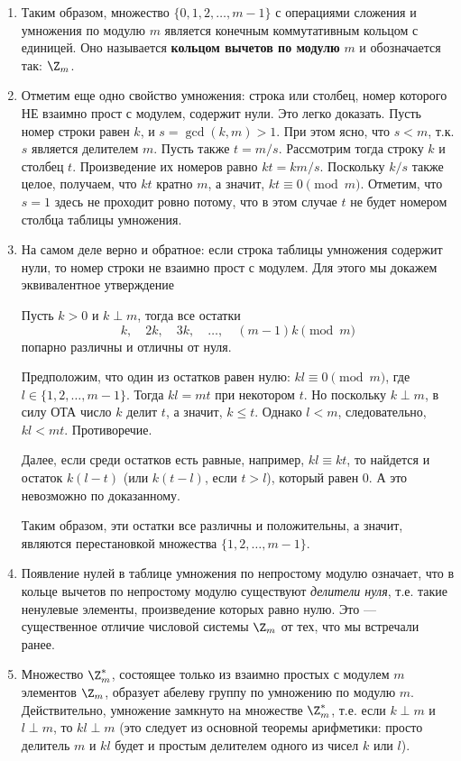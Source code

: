 \begin{enumerate}
\item Таким образом, множество $\{0,1,2,\dots,m-1\}$ с операциями сложения и умножения по модулю $m$ является конечным коммутативным кольцом с единицей. Оно называется \textbf{кольцом вычетов по модулю} $m$ и обозначается так: $\Z_m$.

\item Отметим еще одно свойство умножения: строка или столбец, номер которого НЕ взаимно прост с модулем, содержит нули. Это легко доказать. Пусть номер строки равен $k$, и $s=\gcd(k,m)>1$. При этом ясно, что $s<m$, т.к. $s$ является делителем $m$. Пусть также $t=m/s$. Рассмотрим тогда строку $k$ и столбец $t$. Произведение их номеров равно $kt=km/s$. Поскольку $k/s$ также целое, получаем, что $kt$ кратно $m$, а значит, $kt\equiv 0\pmod m$. Отметим, что $s=1$ здесь не проходит ровно потому, что в этом случае $t$ не будет номером столбца таблицы умножения.
\item На самом деле верно и обратное: если строка таблицы умножения содержит нули, то номер строки не взаимно прост с модулем. Для этого мы докажем эквивалентное утверждение
\begin{thrm}\label{k2k3k}
Пусть $k>0$  и  $k\perp m$, тогда все остатки
$$
k,\quad 2k,\quad 3k,\quad\dots,\quad (m-1)k\pmod m
$$
попарно различны и отличны от нуля.
\end{thrm}
\pf Предположим, что один из остатков равен нулю: $kl\equiv 0\pmod m$, где $l\in\{1,2,\dots,m-1\}$. Тогда $kl=mt$ при некотором $t$. Но поскольку $k\perp m$, в силу ОТА число $k$ делит $t$, а значит, $k\le t$. Однако $l<m$, следовательно, $kl<mt$. Противоречие.

Далее, если среди остатков есть равные, например, $kl\equiv kt$, то найдется и остаток $k(l-t)$ (или $k(t-l)$, если $t>l$), который равен 0. А это невозможно по доказанному. 

Таким образом, эти остатки все различны и положительны, а значит, являются перестановкой множества $\{1,2,\dots,m-1\}$.
\epf

\item Появление нулей в таблице умножения по непростому модулю означает, что в кольце вычетов по непростому модулю существуют \textit{делители нуля}, т.е. такие ненулевые элементы, произведение которых равно нулю. Это --- существенное отличие числовой системы $\Z_m$ от тех, что мы встречали ранее.

\item Множество $\Z_m^*$, состоящее только из взаимно простых с модулем $m$ элементов $\Z_m$, образует абелеву группу по умножению по модулю $m$. Действительно, умножение замкнуто на множестве $\Z_m^*$, т.е. если $k\perp m$ и $l\perp m$, то $kl\perp m$ (это следует из основной теоремы арифметики: просто делитель $m$ и $kl$ будет и простым делителем одного из чисел $k$ или $l$).


\end{enumerate}
